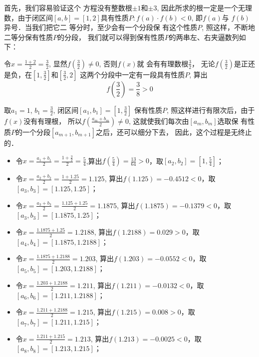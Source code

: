 首先，我们容易验证这个
方程没有整数根$\pm 1$和$\pm 3$, 
因此所求的根一定是一个无理
数，由于闭区间$[a,b]=
[1,2]$具有性质$P:f(a)\cdot f(b)<0$, 即$f(a)$与
$f(b)$异号．当我们把它二
等分时，至少会有一个分段保
有这个性质$P$, 照这样，不断地二等分保有性质$P$的分段，
我们就可以得到保有性质$P$的两串左、右夹逼数列如下：

令$x=\frac{1+2}{2}=\frac{3}{2}$, 
显然$f\left(\frac{3}{2}\right)\ne 0$, 否则$f(x)$就
会有有理数根$\frac{3}{2}$，
无论$f\left(\frac{3}{2}\right)$是正还是负，在$\left[1,\frac{3}{2}\right]$和$\left[\frac{3}{2},2\right]$
这两个分段中一定有一段具有性质$P$, 算出
\[f\left(\frac{3}{2}\right)=\frac{3}{8}>0\]

取$a_1=1$, $b_1=\frac{3}{2}$, 
闭区间$[a_1,b_1]=\left[1,\frac{3}{2}\right]$
保有性质$P$, 照这样进行有限次后，由于$f(x)$没有有理根，
所以$f\left(\frac{a_m+b_m}{2}\right)\ne 0$, 这就使我们每次由$[a_m,b_m]$选取保
有性质$P$的一个分段$[a_{m+1},b_{m+1}]$之后，还可以细分下去，
因此，这个过程是无终止的．
\begin{itemize}
\item 令$x=\frac{a_1+b_1}{2}=\frac{1+\frac{3}{2}}{2}=\frac{5}{4}$,算出$f\left(\frac{5}{4}\right)=\frac{13}{64}>0$，取$[a_2,b_2]=\left[1,\frac{5}{4}\right]$；
\item 
令$x=\frac{a_2+b_2}{2}=\frac{1+1.25}{2}=1.125$, 算出$f\left(1.125\right)=-0.4512<0$，取$[a_3,b_3]=\left[1.125,1.25\right]$；
\item 
令$x=\frac{a_3+b_3}{2}=\frac{1.125+1.25}{2}=1.1875$, 算出$f\left(1.1875\right)=-0.1379<0$，取$[a_3,b_3]=\left[1.1875,1.25\right]$；
\item 
令$x=\frac{1.1875+1.25}{2}=1.2188$, 算出$f\left(1.2188\right)=0.029>0$，取$[a_4,b_4]=\left[1.1875,1.2188\right]$；

\item 
令$x=\frac{1.1875+1.2188}{2}=1.203$, 算出$f\left(1.203\right)=-0.0552<0$，取$[a_5,b_5]=\left[1.203,1.2188\right]$；

\item 
令$x=\frac{1.203+1.2188}{2}=1.211$, 算出$f\left(1.211\right)=-0.0132<0$，取$[a_6,b_6]=\left[1.211,1.2188\right]$；

\item 
令$x=\frac{1.211+1.2188}{2}=1.215$, 算出$f\left(1.215\right)=0.008>0$，取$[a_7,b_7]=\left[1.211,1.215\right]$；

\item 
令$x=\frac{1.211+1.215}{2}=1.213$, 算出$f\left(1.213\right)=-0.0025<0$，取$[a_8,b_8]=\left[1.213,1.215\right]$；

\end{itemize}

